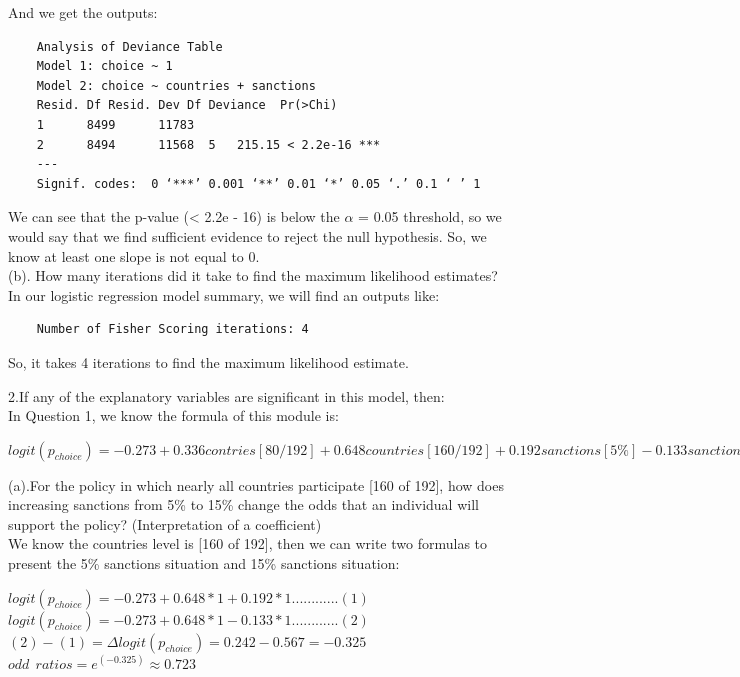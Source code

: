 \documentclass{article} %
\begin{document}
\noindent And we get the outputs:

\begin{verbatim}
	Analysis of Deviance Table
	Model 1: choice ~ 1
	Model 2: choice ~ countries + sanctions  
	Resid. Df Resid. Dev Df Deviance  Pr(>Chi)    
	1      8499      11783                          
	2      8494      11568  5   215.15 < 2.2e-16 ***
	---
	Signif. codes:  0 ‘***’ 0.001 ‘**’ 0.01 ‘*’ 0.05 ‘.’ 0.1 ‘ ’ 1
\end{verbatim}

\noindent We can see that the p-value (< 2.2e - 16) is below the $\alpha$ = 0.05 threshold, so we would say that we find sufficient evidence to reject the null hypothesis. So, we know at least one slope is not equal to 0.\\

\vspace{.5cm}
\noindent (b). How many iterations did it take to find the maximum likelihood estimates?\\

\noindent In our logistic regression model summary, we will find an outputs like: \\
 
\begin{verbatim}
	Number of Fisher Scoring iterations: 4
\end{verbatim}
So, it takes 4 iterations to find the maximum likelihood estimate.

\newpage

\noindent 2.If any of the explanatory variables are significant in this model, then:\\

\noindent In Question 1, we know the formula of this module is:

\begin{center}
$logit(p_{choice}) = -0.273 + 0.336 contries[80/192] + 0.648 countries[160/192] + 0.192 sanctions[5\%] - 0.133 sanctions[15\%] - 0.304 sanctions [20\%]$
\end{center}
\noindent (a).For the policy in which nearly all countries participate [160 of 192], how does increasing sanctions from 5\% to 15\% change the odds that an individual will support the policy? (Interpretation of a coefficient)\\

\noindent We know the countries level is [160 of 192], then we can write two formulas to present the 5\% sanctions situation and 15\% sanctions situation: \\
\begin{center}
$logit(p_{choice}) = -0.273 + 0.648 * 1 + 0.192 * 1 ............ (1) $\\
$logit(p_{choice}) = -0.273 + 0.648 * 1 - 0.133 * 1 ............  (2) $ \\
$(2) - (1) = \Delta logit(p_{choice}) = 0.242 - 0.567 =  - 0.325 $\\
$odd\ \ ratios =  e ^ {(-0.325)} \approx 0.723 $
\end{center}
\end{document}
